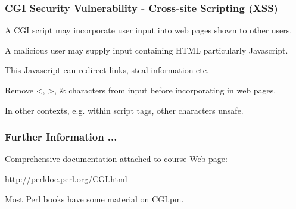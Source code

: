 \begin{frame}
\frametitle{CGI Security Vulnerability - Cross-site Scripting (XSS)}

A CGI script may incorporate user input into web pages shown to other users.

A malicious user may supply input containing HTML particularly Javascript.

This Javascript can redirect links, steal information etc.

Remove {\textless}, \textgreater, \& characters from input before incorporating in web pages.

In other contexts, e.g. within script tags, other characters unsafe.
\end{frame}

\begin{frame}[fragile]
\frametitle{Further Information ...}
Comprehensive documentation attached to course Web page:

\href{http://perldoc.perl.org/CGI.html}{http://perldoc.perl.org/CGI.html}

Most Perl books have some material on CGI.pm.
\end{frame}


